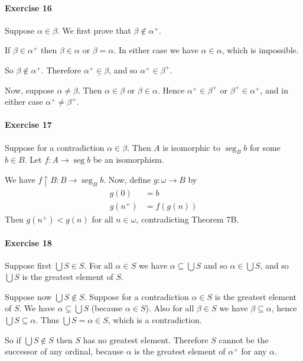 \documentclass{report}
\newcommand{\seg}{\ensuremath{\operatorname{seg}}}
\begin{document}
    \paragraph{Exercise 16}
    Suppose $\alpha \in \beta$. We first prove that $\beta \notin \alpha^+$.

    If $\beta \in \alpha^+$ then $\beta \in \alpha$ or $\beta = \alpha$. In either case we have $\alpha \in
    \alpha$, which is impossible.

    So $\beta \notin \alpha^+$. Therefore $\alpha^+ \underline{\in} \beta$, and so $\alpha^+ \in \beta^+$.

    Now, suppose $\alpha \neq \beta$. Then $\alpha \in \beta$ or $\beta \in \alpha$. Hence $\alpha^+ \in
    \beta^+$ or $\beta^+ \in \alpha^+$, and in either case $\alpha^+ \neq \beta^+$.

    \paragraph{Exercise 17}
    Suppose for a contradiction $\alpha \in \beta$. Then $A$ is isomorphic to $\seg_B b$ for some $b \in B$.
    Let $f : A \rightarrow \seg b$ be an isomorphism.

    We have $f \restriction B : B \rightarrow \seg_B b$. Now, define $g : \omega \rightarrow B$ by
    \begin{align*}
        g(0) & = b \\
        g(n^+) & = f(g(n))
    \end{align*}
    Then $g(n^+) < g(n)$ for all $n \in \omega$, contradicting Theorem 7B.

    \paragraph{Exercise 18}
    Suppose first $\bigcup S \in S$. For all $\alpha \in S$ we have $\alpha \subseteq \bigcup S$ and so
    $\alpha \in \bigcup S$, and so $\bigcup S$ is the greatest element of $S$.

    Suppose now $\bigcup S \notin S$. Suppose for a contradiction $\alpha \in S$ is the greatest element of $S$.
    We have $\alpha \subseteq \bigcup S$ (because $\alpha \in S$).
    Also for all $\beta \in S$ we have $\beta \subseteq \alpha$, hence $\bigcup S \subseteq \alpha$.
    Thus $\bigcup S = \alpha \in S$, which is a contradiction.

    So if $\bigcup S \notin S$ then $S$ has no greatest element. Therefore $S$ cannot be the successor of
    any ordinal, because $\alpha$ is the greatest element of $\alpha^+$ for any $\alpha$.
\end{document}

